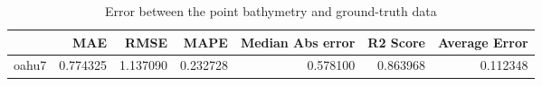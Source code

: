 \begin{table}[h!]
\caption{Error between the point bathymetry and ground-truth data}
\label{tab:oahu7_lidar_error}
\begin{tabular}{lrrrrrr}
\toprule
 & MAE & RMSE & MAPE & Median Abs error & R2 Score & Average Error \\
\midrule
oahu7 & 0.774325 & 1.137090 & 0.232728 & 0.578100 & 0.863968 & 0.112348 \\
\bottomrule
\end{tabular}
\end{table}
